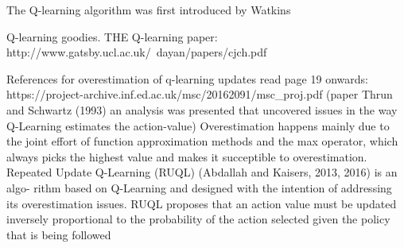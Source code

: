\documentclass{../main.tex}{subfiles}
\begin{document}
The Q-learning algorithm was first introduced by Watkins
\cite{Watkins1992}


Q-learning goodies. THE Q-learning paper: http://www.gatsby.ucl.ac.uk/~dayan/papers/cjch.pdf


References for overestimation of q-learning updates read page 19 onwards: https://project-archive.inf.ed.ac.uk/msc/20162091/msc_proj.pdf (paper Thrun and Schwartz (1993) an analysis was presented that uncovered issues in the way Q-Learning estimates the action-value)
Overestimation happens mainly due to the joint effort of function approximation methods and the max operator, which always picks the highest value and makes it succeptible to overestimation. Repeated Update Q-Learning (RUQL) (Abdallah and Kaisers, 2013, 2016) is an algo-
rithm based on Q-Learning and designed with the intention of addressing its overestimation issues. RUQL proposes that an action value must be updated inversely proportional to the probability of the action selected given the policy that is being followed
\end{document}
